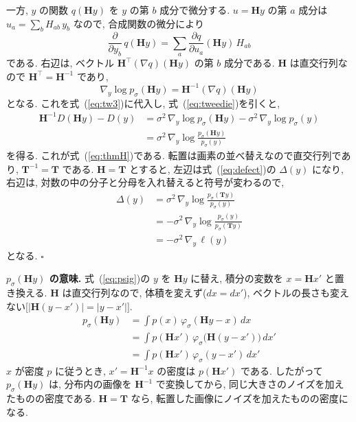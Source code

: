 \documentclass[MIRU,submit]{miru2025j}
\newcommand{\Tm}{\mathbf{T}}            %
\newcommand{\Hm}{\mathbf{H}}            %
\renewcommand{\eqref}[1]{(\ref{#1})}
\begin{document}
一方, $y$ の関数 $q(\Hm y)$ を $y$ の第 $b$ 成分で微分する. $u=\Hm y$ の第 $a$ 成分は $u_a=\sum_b H_{ab}\,y_b$ なので, 合成関数の微分により
\begin{equation}
\frac{\partial}{\partial y_b}\,q(\Hm y)=\sum_{a}\frac{\partial q}{\partial u_a}(\Hm y)\,H_{ab}
\label{eq:chain}
\end{equation}
である. 右辺は, ベクトル $\Hm^{\top}(\nabla q)(\Hm y)$ の第 $b$ 成分である. $\Hm$ は直交行列なので $\Hm^{\top}=\Hm^{-1}$ であり,
\begin{equation}
\nabla_y\log p_\sigma(\Hm y)=\Hm^{-1}(\nabla q)(\Hm y)
\label{eq:chain2}
\end{equation}
となる. これを式~\eqref{eq:tw3}に代入し, 式~\eqref{eq:tweedie}を引くと,
\begin{equation}
\begin{split}
\Hm^{-1}D(\Hm y)-D(y)&=\sigma^{2}\,\nabla_y\log p_\sigma(\Hm y)-\sigma^{2}\,\nabla_y\log p_\sigma(y)\\
&=\sigma^{2}\,\nabla_y\log\frac{p_\sigma(\Hm y)}{p_\sigma(y)}
\end{split}
\label{eq:t2end}
\end{equation}
を得る. これが式~\eqref{eq:thmH}である. 転置は画素の並べ替えなので直交行列であり, $\Tm^{-1}=\Tm$ である. $\Hm=\Tm$ とすると, 左辺は式~\eqref{eq:defect}の $\Delta(y)$ になり, 右辺は, 対数の中の分子と分母を入れ替えると符号が変わるので,
\begin{equation}
\begin{split}
\Delta(y)&=\sigma^{2}\,\nabla_y\log\frac{p_\sigma(\Tm y)}{p_\sigma(y)}\\
&=-\sigma^{2}\,\nabla_y\log\frac{p_\sigma(y)}{p_\sigma(\Tm y)}\\
&=-\sigma^{2}\,\nabla_y\,\ell(y)
\end{split}
\label{eq:t1end}
\end{equation}
となる. \hfill$\square$

\textbf{$p_\sigma(\Hm y)$ の意味.} 式~\eqref{eq:psig}の $y$ を $\Hm y$ に替え, 積分の変数を $x=\Hm x'$ と置き換える. $\Hm$ は直交行列なので, 体積を変えず($dx=dx'$), ベクトルの長さも変えない[$|\Hm(y-x')|=|y-x'|$].
\begin{equation}
\begin{split}
p_\sigma(\Hm y)&=\int p(x)\,\varphi_\sigma(\Hm y-x)\,dx\\
&=\int p(\Hm x')\,\varphi_\sigma\bigl(\Hm(y-x')\bigr)\,dx'\\
&=\int p(\Hm x')\,\varphi_\sigma(y-x')\,dx'
\end{split}
\label{eq:psigH}
\end{equation}
$x$ が密度 $p$ に従うとき, $x'=\Hm^{-1}x$ の密度は $p(\Hm x')$ である. したがって $p_\sigma(\Hm y)$ は, 分布内の画像を $\Hm^{-1}$ で変換してから, 同じ大きさのノイズを加えたものの密度である. $\Hm=\Tm$ なら, 転置した画像にノイズを加えたものの密度になる.
\end{document}
